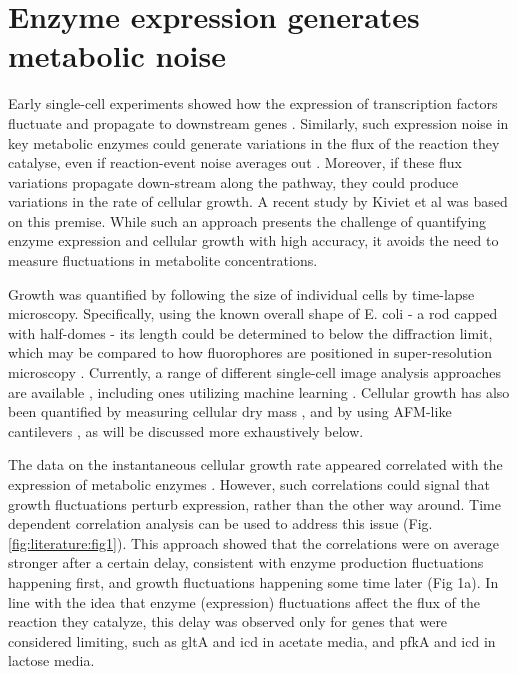 \section{Enzyme expression generates metabolic noise}
Early single-cell experiments showed how the expression of transcription factors fluctuate and propagate to downstream genes \cite{Dunlop2008, Munsky2008, Pedraza2005}. Similarly, such expression noise in key metabolic enzymes could generate variations in the flux of the reaction they catalyse, even if reaction-event noise averages out \cite{Chubukov2014}. Moreover, if these flux variations propagate down-stream along the pathway, they could produce variations in the rate of cellular growth. A recent study by Kiviet et al \cite{Kiviet2014} was based on this premise. While such an approach presents the challenge of quantifying enzyme expression and cellular growth with high accuracy, it avoids the need to measure fluctuations in metabolite concentrations.

Growth was quantified by following the size of individual cells by time-lapse microscopy. Specifically, using the known overall shape of E. coli - a rod capped with half-domes - its length could be determined to below the diffraction limit, which may be compared to how fluorophores are positioned in super-resolution microscopy \cite{Kiviet2014}. Currently, a range of different single-cell image analysis approaches are available \cite{Stylianidou2016, Paintdakhi2016, Kaiser2016, Sachs2016, Nobs2014, Sliusarenko2011, Sadanandan2016, Chowdhury2013}, including ones utilizing machine learning \cite{VanValen2016, VanHeerden2017, Arganda-Carreras2017}. Cellular growth has also been quantified by measuring cellular dry mass \cite{Mir2011}, and by using AFM-like cantilevers \cite{Son2012}, as will be discussed more exhaustively below.

The data on the instantaneous cellular growth rate appeared correlated with the expression of metabolic enzymes \cite{Kiviet2014}. However, such correlations could signal that growth fluctuations perturb expression, rather than the other way around. Time dependent correlation analysis can be used to address this issue \cite{Dunlop2008, Munsky2008} (Fig. \ref{fig:literature:fig1}). This approach showed that the correlations were on average stronger after a certain delay, consistent with enzyme production fluctuations happening first, and growth fluctuations happening some time later (Fig 1a). In line with the idea that enzyme (expression) fluctuations affect the flux of the reaction they catalyze, this delay was observed only for genes that were considered limiting, such as gltA and icd in acetate media, and pfkA and icd in lactose media.

